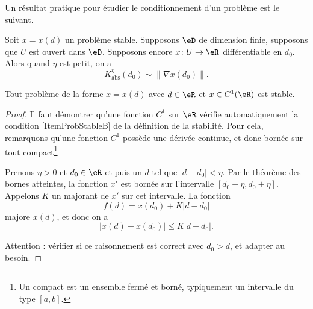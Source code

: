 Un résultat pratique pour étudier le conditionnement d'un problème est le suivant.
\begin{corollary}       \label{CorConditionnementNormeNabla}
	Soit $x=x(d)$ un problème stable. Supposons $\eD$ de dimension finie, supposons que $U$ est ouvert dans $\eD$. Supposons encore $x\colon U\to \eR$ différentiable en $d_0$. Alors quand $\eta$ est petit, on a
	\begin{equation}
		K_{\text{abs}}^{\eta}(d_0)\sim \| \nabla x(d_0) \|.
	\end{equation}
\end{corollary}

\begin{lemma}   \label{LemITCxqyS}
	 Tout  problème de la forme $x=x(d)$ avec $d\in\eR$ et $x \in C^1(\eR)$ est stable.
\end{lemma}

\begin{proof}
	Il faut démontrer qu'une fonction $C^1$ sur $\eR$ vérifie automatiquement la condition \ref{ItemProbStableB} de la définition de la stabilité. Pour cela, remarquons qu'une fonction $C^1$ possède une dérivée continue, et donc bornée sur tout compact\footnote{Un compact est un ensemble fermé et borné, typiquement un intervalle du type $[a,b]$.}

	Prenons $\eta>0$ et $d_0\in\eR$ et puis un $d$ tel que $| d-d_0 |<\eta$. Par le théorème des bornes atteintes, la fonction $x'$ est bornée sur l'intervalle $[d_0-\eta,d_0+\eta]$. Appelons $K$ un majorant de $x'$ sur cet intervalle. La fonction
	\begin{equation}
		f(d)=x(d_0)+K| d-d_0 |
	\end{equation}
	majore $x(d)$, et donc on a
	\begin{equation}
		\big| x(d)-x(d_0) \big|\leq K| d-d_0 |.
	\end{equation}

	Attention : vérifier si ce raisonnement est correct avec $d_0>d$, et adapter au besoin.
\end{proof}

